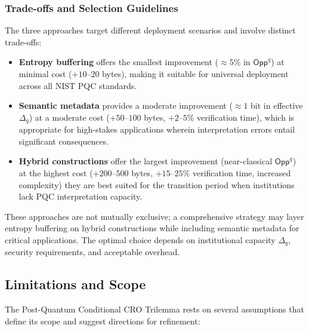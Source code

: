 \documentclass{ieeeaccess}
\newcommand{\Opp}{\mathsf{Opp}}
\begin{document}
\subsubsection{Trade-offs and Selection Guidelines}

The three approaches target different deployment scenarios and involve distinct 
trade-offs:

\begin{itemize}
    \item \textbf{Entropy buffering} offers the smallest improvement ($\approx 5\%$ 
    in $\Opp^q$) at minimal cost ($+10$--$20$ bytes), making it suitable for universal 
    deployment across all NIST PQC standards.
    
    \item \textbf{Semantic metadata} provides a moderate improvement ($\approx 1$ bit 
    in effective $\Delta_q$) at a moderate cost ($+50$--$100$ bytes, $+2$--$5\%$ 
    verification time), which is appropriate for high-stakes applications wherein interpretation 
    errors  entail significant consequences.
    
    \item \textbf{Hybrid constructions} offer the largest improvement (near-classical 
    $\Opp^q$) at the highest cost ($+200$--$500$ bytes, $+15$--$25\%$ verification 
    time, increased complexity) they are best suited for the transition period when 
    institutions lack PQC interpretation capacity.
\end{itemize}

These approaches are not mutually exclusive; a comprehensive strategy may layer 
entropy buffering on hybrid constructions while including semantic metadata for 
critical applications. The optimal choice depends on institutional capacity $\Delta_q$, 
security requirements, and acceptable overhead.

\subsection{Limitations and Scope}

The Post-Quantum Conditional CRO Trilemma rests on several assumptions that define 
its scope and suggest directions for refinement:
\end{document}

